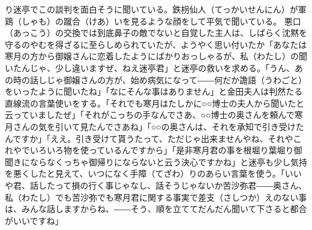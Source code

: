 \documentclass{book}
\begin{document}
り迷亭でこの談判を面白そうに聞いている。鉄枴仙人（てっかいせんにん）が軍鶏（しゃも）の蹴合（けあ）いを見るような顔をして平気で聞いている。
悪口（あっこう）の交換では到底鼻子の敵でないと自覚した主人は、しばらく沈黙を守るのやむを得ざるに至らしめられていたが、ようやく思い付いたか「あなたは寒月の方から御嬢さんに恋着したようにばかりおっしゃるが、私（わたし）の聞いたんじゃ、少し違いますぜ、ねえ迷亭君」と迷亭の救いを求める。「うん、あの時の話しじゃ御嬢さんの方が、始め病気になって――何だか譫語（うわごと）をいったように聞いたね」「なにそんな事はありません」と金田夫人は判然たる直線流の言葉使いをする。「それでも寒月はたしかに○○博士の夫人から聞いたと云っていましたぜ」「それがこっちの手なんでさあ、○○博士の奥さんを頼んで寒月さんの気を引いて見たんでさあね」「○○の奥さんは、それを承知で引き受けたんですか」「ええ。引き受けて貰うたって、ただじゃ出来ませんやね、それやこれやでいろいろ物を使っているんですから」「是非寒月君の事を根堀り葉堀り御聞きにならなくっちゃ御帰りにならないと云う決心ですかね」と迷亭も少し気持を悪くしたと見えて、いつになく手障（てざわ）りのあらい言葉を使う。「いいや君、話したって損の行く事じゃなし、話そうじゃないか苦沙弥君――奥さん、私（わたし）でも苦沙弥でも寒月君に関する事実で差支（さしつか）えのない事は、みんな話しますからね、――そう、順を立ててだんだん聞いて下さると都合がいいですね」
\end{document}
